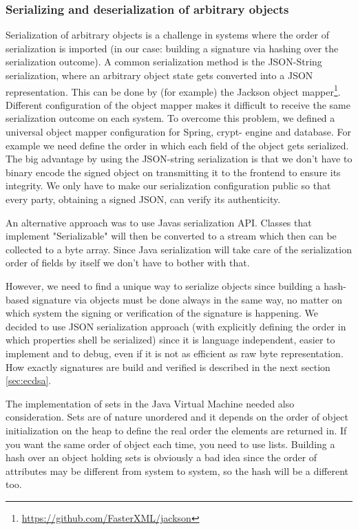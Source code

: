 \subsubsection{Serializing and deserialization of arbitrary objects}
\label{sec:serialobject}

Serialization of arbitrary objects is a challenge in systems where the order of serialization is imported (in our case: building a signature via hashing over the serialization outcome). A common serialization method is the JSON-String serialization, where an arbitrary object state gets converted into a JSON representation. This can be done by (for example) the Jackson object mapper\footnote{\url{https://github.com/FasterXML/jackson}}. Different configuration of the object mapper makes it difficult to receive the same serialization outcome on each system. To overcome this problem, we defined a universal object mapper configuration for Spring, crypt- engine and database. For example we need define the order  in which each field of the object gets serialized. The big advantage by using the JSON-string serialization is that we don’t have to binary encode the signed object on transmitting it to the frontend to ensure its integrity. We only have to make our serialization configuration public so that every party, obtaining a signed JSON, can verify its authenticity.

An alternative approach was to use Javas serialization API. Classes that implement "Serializable" will then be converted to a stream which then can be collected to a byte array. Since Java serialization will take care of the serialization order of fields by itself we don’t have to bother with that. 

However, we need to find a unique way to serialize objects since building a hash-based signature via objects must be done always in the same way, no matter on which system the signing or verification of the signature is happening. We decided to use JSON serialization approach (with explicitly defining the order in which properties shell be serialized) since it is language independent, easier to implement and to debug, even if it is not as efficient as raw byte representation. How exactly signatures are build and verified is described in the next section \ref{sec:ecdsa}. 

The implementation of sets in the Java Virtual Machine needed also consideration. Sets are of nature unordered and it depends on the order of object initialization on the heap to define the real order the elements are returned in. If you want the same order of object each time, you need to use lists. Building a hash over an object holding sets is obviously a bad idea since the order of attributes may be different from system to system, so the hash will be a different too.  

